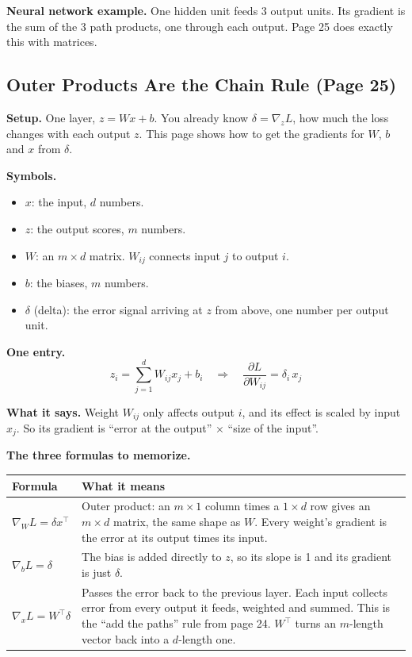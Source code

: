 \textbf{Neural network example.} One hidden unit feeds 3 output units. Its gradient is the sum of the 3 path products, one through each output. Page 25 does exactly this with matrices.

\subsection*{Outer Products Are the Chain Rule (Page 25)}

\textbf{Setup.} One layer, $z = Wx + b$. You already know $\delta = \nabla_z L$, how much the loss changes with each output $z$. This page shows how to get the gradients for $W$, $b$ and $x$ from $\delta$.

\textbf{Symbols.}
\begin{itemize}
  \item $x$: the input, $d$ numbers.
  \item $z$: the output scores, $m$ numbers.
  \item $W$: an $m \times d$ matrix. $W_{ij}$ connects input $j$ to output $i$.
  \item $b$: the biases, $m$ numbers.
  \item $\delta$ (delta): the error signal arriving at $z$ from above, one number per output unit.
\end{itemize}

\textbf{One entry.}
\[
z_i = \sum_{j=1}^{d} W_{ij} x_j + b_i \quad\Longrightarrow\quad \frac{\partial L}{\partial W_{ij}} = \delta_i \, x_j
\]

\textbf{What it says.} Weight $W_{ij}$ only affects output $i$, and its effect is scaled by input $x_j$. So its gradient is ``error at the output'' $\times$ ``size of the input''.

\textbf{The three formulas to memorize.}

\begin{tabular}{>{\raggedright\arraybackslash}p{}>{\raggedright\arraybackslash}p{}}
\toprule
Formula & What it means \\
\midrule
$\nabla_W L = \delta x^\top$ & Outer product: an $m\times 1$ column times a $1 \times d$ row gives an $m \times d$ matrix, the same shape as $W$. Every weight's gradient is the error at its output times its input. \\
$\nabla_b L = \delta$ & The bias is added directly to $z$, so its slope is 1 and its gradient is just $\delta$. \\
$\nabla_x L = W^\top \delta$ & Passes the error back to the previous layer. Each input collects error from every output it feeds, weighted and summed. This is the ``add the paths'' rule from page 24. $W^\top$ turns an $m$-length vector back into a $d$-length one. \\
\bottomrule
\end{tabular}

